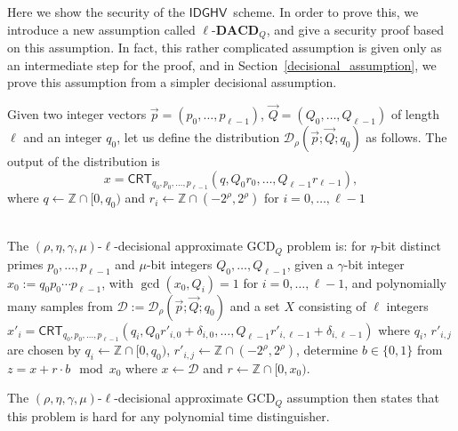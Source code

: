 \documentclass[11pt]{llncs}
\newcommand{\Z}{{\mathbb Z}}
\newcommand*{\crt}{\ensuremath{\mathsf{CRT}}}
\newcommand*{\CDGHV}{\ensuremath{\mathsf{IDGHV}}}
\newcommand*\D{\ensuremath{\mathcal D}}
\begin{document}
Here we show the security of the \CDGHV\ scheme.  In order to prove this, we introduce a new assumption called $\ell$-$\mathbf{DACD}_Q$, and give a security proof based on this assumption.  In fact, this rather complicated assumption is given only as an intermediate step for the proof, and in Section~\ref{decisional_assumption}, we prove this assumption from a simpler decisional assumption.

Given two integer vectors $\vec{p}=(p_0, \dots, p_{\ell-1})$, $\vec{Q}=(Q_0, \dots, Q_{\ell-1})$ of length $\ell$ and an integer $q_0$, let us define the distribution $\D_\rho(\vec{p}; \vec{Q}; q_0)$ as follows.  The output of the distribution is
\[
x=\crt_{q_0,p_0,\dots,p_{\ell-1}}(q,Q_0r_0,\dots,Q_{\ell-1}r_{\ell-1}),
\]
where $q\gets\Z\cap[0,q_0)$ and $r_i\gets\Z\cap(-2^\rho,2^\rho)$ for $i=0,\dots,\ell-1$

\begin{definition} \\
The $(\rho,\eta,\gamma,\mu)$-$\ell$-decisional approximate GCD$_Q$ problem is: for $\eta$-bit distinct primes $p_0,\dots,p_{\ell-1}$ and $\mu$-bit integers $Q_0,\dots,Q_{\ell-1}$, given a $\gamma$-bit integer  $x_0:=q_0p_0\cdots p_{\ell-1}$, with $\gcd(x_0,Q_i)=1$ for $i=0,\dots,\ell-1$, and  %
polynomially many samples from $\D:=\D_{\rho}(\vec{p};\vec{Q};q_0)$ and a set $X$ consisting of $\ell$ integers $x'_i=\crt_{q_0,p_0,\dots,p_{\ell-1}}(q_i,Q_0r'_{i,0}+\delta_{i,0},\dots,Q_{\ell-1}r'_{i,\ell-1}+\delta_{i,\ell-1})$ where $q_i$, $r'_{i,j}$ are chosen by
$q_i\gets\Z\cap[0,q_0)$, $r'_{i,j}\gets\Z\cap(-2^\rho,2^\rho)$, determine $b\in\{0,1\}$ from $z=x+r\cdot b\mod x_0$ where $x\gets\D$ and $r\gets\Z\cap[0,x_0)$.
\end{definition}

The $(\rho,\eta,\gamma,\mu)$-$\ell$-decisional approximate GCD$_Q$ assumption then states that this problem is hard for any polynomial time distinguisher.
\end{document}

